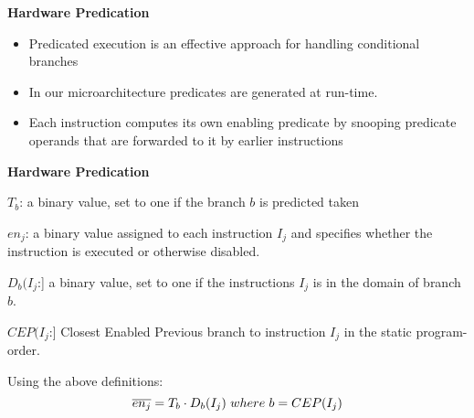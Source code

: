 \documentclass[12pt]{slides}
\begin{document}
\begin{slide}
\begin{center}
\textbf {Hardware Predication}
\end{center}
%
\begin{itemize}
%
\item 
Predicated execution is an effective approach for handling conditional branches 
%
\item
In our microarchitecture predicates are generated at run-time.
%
\item
Each instruction computes its own enabling predicate by snooping 
predicate operands that are forwarded to it by earlier instructions 
%
\end{itemize}
\end{slide}



\begin{slide}
\begin{center}
\textbf {Hardware Predication}
\end{center}
%

{} 

\begin{list}{\mbox{}}
\small{
\item $T_b$: a binary value, set to one if the branch $b$ is
predicted taken
\item $en_j$: a binary value assigned to each
instruction $I_j$ and specifies whether the instruction is
executed or otherwise disabled.
\item $D_b(I_j $:] a binary value,
set to one if the instructions $I_j$ is in the domain of branch $b$.
\item $CEP(I_j $:] Closest Enabled Previous branch to instruction
$I_j$ in the static program-order.
}
\end{list}

Using the above definitions: 
\begin{equation}
\small{
\overline{en_j} = T_b \cdot D_b(I_j)  \textstyle{\ where\ } b = CEP(I_j)
}
\end{equation}
\end{slide}
\end{document}
